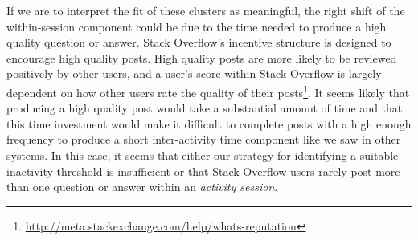 If we are to interpret the fit of these clusters as meaningful, the right shift of the within-session component could be due to the time needed to produce a high quality question or answer.  Stack Overflow's incentive structure is designed to encourage high quality posts.  High quality posts are more likely to be reviewed positively by other users, and a user's score within Stack Overflow is largely dependent on how other users rate the quality of their posts\footnote{\url{http://meta.stackexchange.com/help/whats-reputation}}.  It seems likely that producing a high quality post would take a substantial amount of time and that this time investment would make it difficult to complete posts with a high enough frequency to produce a short inter-activity time component like we saw in other systems.  In this case, it seems that either our strategy for identifying a suitable inactivity threshold is insufficient or that Stack Overflow users rarely post more than one question or answer within an \emph{activity session}.

\vskip 20pt
